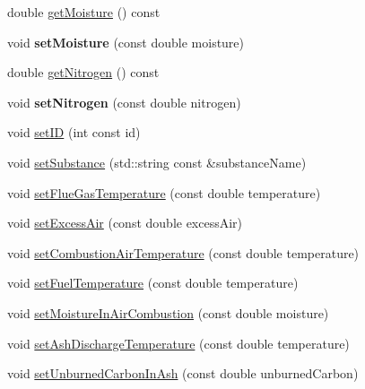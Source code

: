 \begin{DoxyCompactItemize}
\item 
double \hyperlink{class_solid_liquid_flue_gas_material_accf3c8be942d0ba244f6eabab6e7012b}{get\+Moisture} () const
\item 
\mbox{\label{class_solid_liquid_flue_gas_material_ac811fd9fee43bc497dc53c1e55c17fea}} 
void {\bfseries set\+Moisture} (const double moisture)
\item 
double \hyperlink{class_solid_liquid_flue_gas_material_a76159a5d9d609f0e0131f7bca3b60ebc}{get\+Nitrogen} () const
\item 
\mbox{\label{class_solid_liquid_flue_gas_material_a7082dd41a06397a8ae714096c091bfbe}} 
void {\bfseries set\+Nitrogen} (const double nitrogen)
\item 
void \hyperlink{class_solid_liquid_flue_gas_material_a6046d06703bd496745121b62eab4f40f}{set\+ID} (int const id)
\item 
void \hyperlink{class_solid_liquid_flue_gas_material_a54be915432c1300c4d8eaf7bf2be361f}{set\+Substance} (std\+::string const \&substance\+Name)
\item 
void \hyperlink{class_solid_liquid_flue_gas_material_ae647700dbff5ccea7938b2117f2c3156}{set\+Flue\+Gas\+Temperature} (const double temperature)
\item 
void \hyperlink{class_solid_liquid_flue_gas_material_a7a3f9f77d267afc05f5fde1da9329ec5}{set\+Excess\+Air} (const double excess\+Air)
\item 
void \hyperlink{class_solid_liquid_flue_gas_material_a626dfbc9ba87abff99e5c5a8204d69c6}{set\+Combustion\+Air\+Temperature} (const double temperature)
\item 
void \hyperlink{class_solid_liquid_flue_gas_material_a420ba1234c5f8c4b93f190b61046a589}{set\+Fuel\+Temperature} (const double temperature)
\item 
void \hyperlink{class_solid_liquid_flue_gas_material_a1a5f1bd3008e78cce62edb8aca642284}{set\+Moisture\+In\+Air\+Combustion} (const double moisture)
\item 
void \hyperlink{class_solid_liquid_flue_gas_material_ad29543a88737c3d051c7d824287bc791}{set\+Ash\+Discharge\+Temperature} (const double temperature)
\item 
void \hyperlink{class_solid_liquid_flue_gas_material_adf052dd1bdceeab710a4986b1fd874b9}{set\+Unburned\+Carbon\+In\+Ash} (const double unburned\+Carbon)
\end{DoxyCompactItemize}
